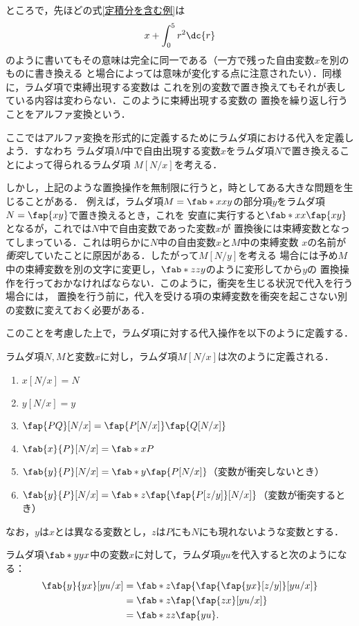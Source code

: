 \documentclass[uplatex,dvipdfmx,report,fleqn]{jsbook}
\begin{document}
ところで，先ほどの式\eqref{定積分を含む例}は
\[
x + \int^5_0 r^2\dc{r}
\]
のように書いてもその意味は完全に同一である（一方で残った自由変数$x$を別のものに書き換える
と場合によっては意味が変化する点に注意されたい）．同様に，ラムダ項で束縛出現する変数は
これを別の変数で置き換えてもそれが表している内容は変わらない．このように束縛出現する変数の
置換を繰り返し行うことをアルファ変換という．

ここではアルファ変換を形式的に定義するためにラムダ項における代入を定義しよう．すなわち
ラムダ項$M$中で自由出現する変数$x$をラムダ項$N$で置き換えることによって得られるラムダ項
$M[N/x]$を考える．

しかし，上記のような置換操作を無制限に行うと，時としてある大きな問題を生じることがある．
例えば，ラムダ項$M=\fab*{x}{xy}$の部分項$y$をラムダ項$N=\fap{xy}$で置き換えるとき，これを
安直に実行すると$\fab*{x}{x\fap{xy}}$となるが，これでは$N$中で自由変数であった変数$x$が
置換後には束縛変数となってしまっている．これは明らかに$N$中の自由変数$x$と$M$中の束縛変数
$x$の名前が\emph{衝突}していたことに原因がある．したがって$M[N/y]$を考える
場合には予め$M$中の束縛変数を別の文字に変更し，$\fab*{z}{zy}$のように変形してから$y$の
置換操作を行っておかなければならない．このように，衝突を生じる状況で代入を行う場合には，
置換を行う前に，代入を受ける項の束縛変数を衝突を起こさない別の変数に変えておく必要がある．

このことを考慮した上で，ラムダ項に対する代入操作を以下のように定義する．
%
\begin{definition}[ラムダ項に対する代入]
ラムダ項$N,M$と変数$x$に対し，ラムダ項$M[N/x]$は次のように定義される．
%
\begin{enumerate}
\item $x[N/x] = N$
\item $y[N/x] = y$
\item $\fap{PQ}[N/x] = \fap{P[N/x]}\fap{Q[N/x]}$
\item $\fab{x}{P}[N/x] = \fab*{x}{P}$
\item $\fab{y}{P}[N/x] = \fab*{y}{\fap{P[N/x]}}$（変数が衝突しないとき）
\item $\fab{y}{P}[N/x] = \fab*{z}{\fap{\fap{P[z/y]}[N/x]}}$（変数が衝突するとき）
\end{enumerate}
%
なお，$y$は$x$とは異なる変数とし，$z$は$P$にも$N$にも現れないような変数とする．
\end{definition}
%
\begin{example}
ラムダ項$\fab*{y}{yx}$中の変数$x$に対して，ラムダ項$yu$を代入すると次のようになる：
%
\begin{align*}
\fab{y}{yx}[yu/x] &= \fab*{z}{\fap{\fap{\fap{yx}[z/y]}[yu/x]}} \\
&= \fab*{z}{\fap{\fap{zx}[yu/x]}} \\
&= \fab*{z}{z\fap{yu}}.
\end{align*}
\end{example}
\end{document}

